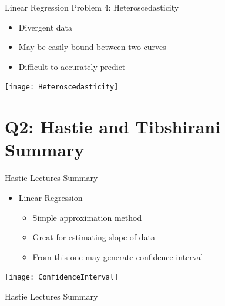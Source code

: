 \documentclass{beamer}
\begin{document}
\begin{frame}{Linear Regression Problem 4: Heteroscedasticity}
	\begin{itemize}
		\item Divergent data
		\item May be easily bound between two curves
		\item Difficult to accurately predict 
	\end{itemize}
	\centering
	\texttt{[image: Heteroscedasticity]}
\end{frame}

\section[Q2]{Q2: Hastie and Tibshirani Summary}

\begin{frame}{Hastie Lectures Summary}
	\begin{itemize}
		\item Linear Regression
		\begin{itemize}
			\item Simple approximation method
			\item Great for estimating slope of data
			\item From this one may generate confidence interval
		\end{itemize}
		
	\end{itemize}
	\texttt{[image: ConfidenceInterval]}
\end{frame}

\begin{frame}{Hastie Lectures Summary}
	
\end{frame}

\end{document}
